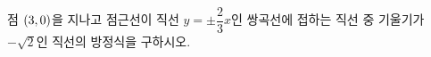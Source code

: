 점 $(3{,}\mkern3mu\mathopen{}0)$을 지나고 점근선이 직선 $y=\pm\dfrac{2}{3}x$인 쌍곡선에 접하는 직선 중 기울기가 $-\sqrt{2}$인 직선의 방정식을 구하시오.
